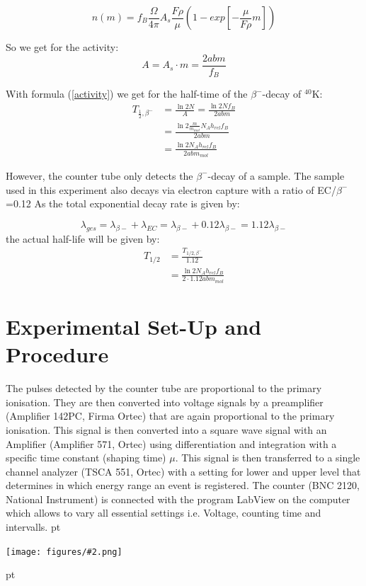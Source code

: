 \documentclass[12pt]{article}
\newcommand{\gra}[3][0.7]{
	\begin{minipage}[h!]{\textwidth}
		\centering
		\texttt{[image: figures/\#2.png]}
		\captionof{figure}{#3}
	\end{minipage}
	\vskip 30 pt
	}
\begin{document}
\[n(m) = f_B\frac{\Omega}{4\pi}A_s\frac{F\rho}{\mu}\left( 1-exp\left[ -\frac{\mu}{F\rho}m\right] \right) \]

So we get for the activity: $$A=A_s\cdot m=\frac{2abm}{f_B}$$

With formula (\ref{activity}) we get for the half-time of the $\beta^-$-decay of $^{40}$K:
\begin{align*}
	T_{\frac12,\beta^-}&=\frac{\ln2N}{A}=\frac{\ln2Nf_B}{2abm}\\&=\frac{\ln2\frac{m}{m_{mol}}N_Ah_{rel}f_B}{2abm}\\&=\frac{\ln2N_Ah_{rel}f_B}{2abm_{mol}}
\end{align*}

However, the counter tube only detects the $\beta^-$-decay of a sample. The sample used in this experiment also decays via electron capture with a ratio of EC/$\beta^-$=0.12
As the total exponential decay rate is given by:

\[\lambda_{ges} = \lambda_{\beta-} + \lambda_{EC} = \lambda_{\beta-}+0.12\lambda_{\beta-} = 1.12\lambda_{\beta-}\]
the actual half-life will be given by:
\begin{align}
	T_{1/2} &= \frac{T_{1/2,\beta^-}}{1.12}\\
	&=\frac{\ln2N_Ah_{rel}f_B}{2\cdot1.12abm_{mol}}\label{halftimeKa}
\end{align}

 

 

 

 
\newpage
\section{Experimental Set-Up and Procedure }
The pulses detected by the counter tube are proportional to the primary ionisation. They are then converted into voltage signals by a preamplifier (Amplifier 142PC, Firma Ortec) that are again proportional to the primary ionisation. This signal is then converted into a square wave signal with an Amplifier (Amplifier 571, Ortec) using differentiation and integration with a specific time constant (shaping time) $\mu$. This signal is then transferred to a single channel analyzer (TSCA 551, Ortec) with a setting for lower and upper level that determines in which energy range an event is registered. The counter (BNC 2120, National Instrument) is connected with  the program LabView on the computer which allows to vary all essential settings i.e. Voltage, counting time and intervalls.
 pt
\gra[0.8]{Versuchsaufbau}{Experimental Set-Up}
\end{document}
